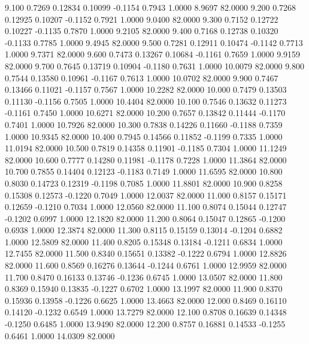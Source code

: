    9.100   0.7269   0.12834   0.10099  -0.1154   0.7943   1.0000   8.9697  82.0000
   9.200   0.7268   0.12925   0.10207  -0.1152   0.7921   1.0000   9.0400  82.0000
   9.300   0.7152   0.12722   0.10227  -0.1135   0.7870   1.0000   9.2105  82.0000
   9.400   0.7168   0.12738   0.10320  -0.1133   0.7785   1.0000   9.4945  82.0000
   9.500   0.7281   0.12911   0.10474  -0.1142   0.7713   1.0000   9.7371  82.0000
   9.600   0.7473   0.13267   0.10684  -0.1161   0.7659   1.0000   9.9159  82.0000
   9.700   0.7645   0.13719   0.10904  -0.1180   0.7631   1.0000  10.0079  82.0000
   9.800   0.7544   0.13580   0.10961  -0.1167   0.7613   1.0000  10.0702  82.0000
   9.900   0.7467   0.13466   0.11021  -0.1157   0.7567   1.0000  10.2282  82.0000
  10.000   0.7479   0.13503   0.11130  -0.1156   0.7505   1.0000  10.4404  82.0000
  10.100   0.7546   0.13632   0.11273  -0.1161   0.7450   1.0000  10.6271  82.0000
  10.200   0.7657   0.13842   0.11444  -0.1170   0.7401   1.0000  10.7926  82.0000
  10.300   0.7838   0.14226   0.11660  -0.1188   0.7359   1.0000  10.9345  82.0000
  10.400   0.7945   0.14566   0.11852  -0.1199   0.7335   1.0000  11.0194  82.0000
  10.500   0.7819   0.14358   0.11901  -0.1185   0.7304   1.0000  11.1249  82.0000
  10.600   0.7777   0.14280   0.11981  -0.1178   0.7228   1.0000  11.3864  82.0000
  10.700   0.7855   0.14404   0.12123  -0.1183   0.7149   1.0000  11.6595  82.0000
  10.800   0.8030   0.14723   0.12319  -0.1198   0.7085   1.0000  11.8801  82.0000
  10.900   0.8258   0.15308   0.12573  -0.1220   0.7049   1.0000  12.0037  82.0000
  11.000   0.8157   0.15171   0.12659  -0.1210   0.7034   1.0000  12.0560  82.0000
  11.100   0.8074   0.15044   0.12747  -0.1202   0.6997   1.0000  12.1820  82.0000
  11.200   0.8064   0.15047   0.12865  -0.1200   0.6938   1.0000  12.3874  82.0000
  11.300   0.8115   0.15159   0.13014  -0.1204   0.6882   1.0000  12.5809  82.0000
  11.400   0.8205   0.15348   0.13184  -0.1211   0.6834   1.0000  12.7455  82.0000
  11.500   0.8340   0.15651   0.13382  -0.1222   0.6794   1.0000  12.8826  82.0000
  11.600   0.8569   0.16276   0.13644  -0.1244   0.6761   1.0000  12.9959  82.0000
  11.700   0.8470   0.16133   0.13746  -0.1236   0.6745   1.0000  13.0507  82.0000
  11.800   0.8369   0.15940   0.13835  -0.1227   0.6702   1.0000  13.1997  82.0000
  11.900   0.8370   0.15936   0.13958  -0.1226   0.6625   1.0000  13.4663  82.0000
  12.000   0.8469   0.16110   0.14120  -0.1232   0.6549   1.0000  13.7279  82.0000
  12.100   0.8708   0.16639   0.14348  -0.1250   0.6485   1.0000  13.9490  82.0000
  12.200   0.8757   0.16881   0.14533  -0.1255   0.6461   1.0000  14.0309  82.0000
